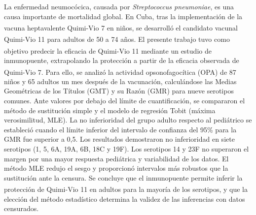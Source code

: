\begin{resumen}
	La enfermedad neumocócica, causada por \textit{Streptococcus pneumoniae}, es una causa importante de mortalidad global. En Cuba, tras la implementación de la vacuna heptavalente Quimi-Vio\textsuperscript{\textregistered} 7 en niños, se desarrolló el candidato vacunal Quimi-Vio\textsuperscript{\textregistered} 11 para adultos de 50 a 74 años. El presente trabajo tuvo como objetivo predecir la eficacia de Quimi-Vio\textsuperscript{\textregistered} 11 mediante un estudio de inmunopuente, extrapolando la protección a partir de la eficacia observada de Quimi-Vio\textsuperscript{\textregistered} 7. Para ello, se analizó la actividad opsonofagocítica (OPA) de 87 niños y 65 adultos un mes después de la vacunación, calculándose las Medias Geométricas de los Títulos (GMT) y su Razón (GMR) para nueve serotipos comunes. Ante valores por debajo del límite de cuantificación, se compararon el método de sustitución simple y el modelo de regresión Tobit (máxima verosimilitud, MLE). La no inferioridad del grupo adulto respecto al pediátrico se estableció cuando el límite inferior del intervalo de confianza del 95\% para la GMR fue superior a 0,5.  Los resultados demostraron no inferioridad en siete serotipos (1, 5, 6A, 19A, 6B, 18C y 19F). Los serotipos 14 y 23F no superaron el margen por una mayor respuesta pediátrica y variabilidad de los datos. El método MLE redujo el sesgo y proporcionó intervalos más robustos que la sustitución ante la censura. Se concluye que el inmunopuente permite inferir la protección de Quimi-Vio\textsuperscript{\textregistered} 11 en adultos para la mayoría de los serotipos, y que la elección del método estadístico determina la validez de las inferencias con datos censurados.
\end{resumen}

